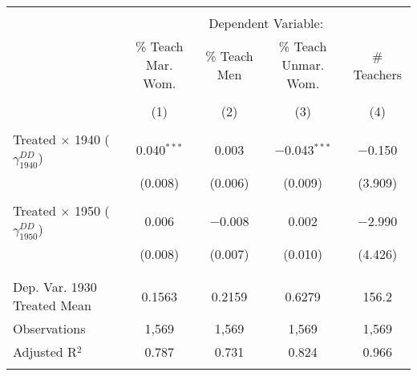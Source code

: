 
\begin{tabular}{@{\extracolsep{5pt}}lcccc} 
\\[-1.8ex]\hline 
\hline \\[-1.8ex] 
 & \multicolumn{4}{c}{Dependent Variable:} \\ 
\cline{2-5} 
 & \% Teach Mar. Wom. & \% Teach Men & \% Teach Unmar. Wom. & \# Teachers \\ 
\\[-1.8ex] & (1) & (2) & (3) & (4)\\ 
\hline \\[-1.8ex] 
 Treated $\times$ 1940 ($\gamma_{1940}^{DD}$) & 0.040$^{***}$ & 0.003 & $-$0.043$^{***}$ & $-$0.150 \\ 
  & (0.008) & (0.006) & (0.009) & (3.909) \\ 
  & & & & \\ 
 Treated $\times$ 1950 ($\gamma_{1950}^{DD}$) & 0.006 & $-$0.008 & 0.002 & $-$2.990 \\ 
  & (0.008) & (0.007) & (0.010) & (4.426) \\ 
  & & & & \\ 
\hline \\[-1.8ex] 
Dep. Var. 1930 Treated Mean & 0.1563 & 0.2159 & 0.6279 & 156.2 \\ 
Observations & 1,569 & 1,569 & 1,569 & 1,569 \\ 
Adjusted R$^{2}$ & 0.787 & 0.731 & 0.824 & 0.966 \\ 
\hline 
\hline \\[-1.8ex] 
\end{tabular} 
